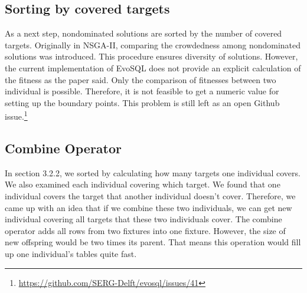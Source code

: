 \subsection{Sorting by covered targets}
As a next step, nondominated solutions are sorted by the number of covered targets. Originally in NSGA-II, comparing the crowdedness among nondominated solutions was introduced. This procedure ensures diversity of solutions. However, the current implementation of EvoSQL does not provide an explicit calculation of the fitness as the paper said. Only the comparison of fitnesses between two individual is possible. Therefore, it is not feasible to get a numeric value for setting up the boundary points. This problem is still left as an open Github issue.\footnote[1]{\href{https://github.com/SERG-Delft/evosql/issues/41}{https://github.com/SERG-Delft/evosql/issues/41}}

\subsection{Combine Operator}

In section 3.2.2, we sorted by calculating how many targets one individual covers. We also examined each individual covering which target. We found that one individual covers the target that another individual doesn’t cover. Therefore, we came up with an idea that if we combine these two individuals, we can get new individual covering all targets that these two individuals cover. The combine operator adds all rows from two fixtures into one fixture. However, the size of new offspring would be two times its parent. That means this operation would fill up one individual’s tables quite fast.

